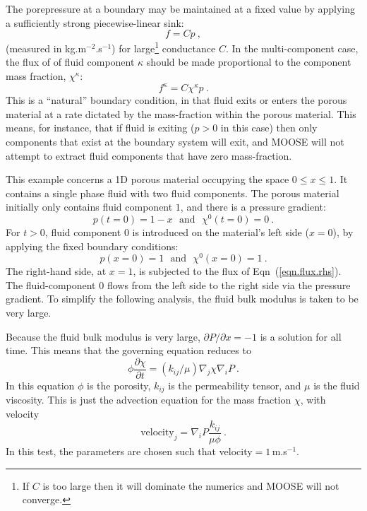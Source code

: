 \documentclass[]{scrreprt}
\begin{document}
The porepressure at a boundary may be maintained at a fixed value by
applying a sufficiently strong piecewise-linear sink:
\begin{equation}
f = Cp \ ,
\end{equation}
(measured in kg.m$^{-2}$.s$^{-1}$) for large\footnote{If $C$ is too
  large then it will dominate the numerics and MOOSE will not
  converge.} conductance $C$.  In the multi-component case, the flux
of of fluid component $\kappa$ should be made proportional to the
component mass fraction, $\chi^{\kappa}$:
\begin{equation}
f^{\kappa} = C\chi^{\kappa}p \ .
\label{eqn.flux.rhs}
\end{equation}
This is a ``natural'' boundary condition, in that fluid exits or
enters the porous material at a rate dictated by the mass-fraction
within the porous material.  This means, for instance, that if fluid
is exiting ($p>0$ in this case) then only components that exist at the
boundary system will exit, and MOOSE will not attempt to extract fluid
components that have zero mass-fraction.

This example concerns a 1D porous material occupying the space $0\leq
x \leq 1$.  It contains a single phase fluid with two
fluid components.  The porous material initially only contains fluid
component $1$, and there is a pressure gradient:
\begin{equation}
p(t=0) = 1 - x \ \ \ \mbox{and}\ \ \ \chi^{0}(t=0) = 0 \ .
\end{equation}
For $t>0$, fluid component $0$ is introduced on the material's left
side ($x=0$), by applying the fixed boundary conditions:
\begin{equation}
p(x=0) = 1 \ \ \ \mbox{and}\ \ \ \chi^{0}(x=0) = 1 \ .
\end{equation}
The right-hand side, at $x=1$, is subjected to the flux of
Eqn~(\ref{eqn.flux.rhs}).  The fluid-component $0$ flows from the left
side to the right side via the pressure gradient.  To simplify the
following analysis, the fluid bulk modulus is taken to be very large.

Because the fluid bulk modulus is very large, $\partial P/\partial x = -1$ is a
solution for all time.  This means that the governing equation reduces
to
\begin{equation}
\phi \frac{\partial \chi}{\partial t} =  (k_{ij}/\mu) \nabla_{j}
\chi \nabla_{i}P \ .
\end{equation}
In this equation $\phi$ is the porosity, $k_{ij}$ is the permeability
tensor, and $\mu$ is the fluid viscosity.  This is just the advection
equation for the mass fraction $\chi$, with velocity
\begin{equation}
\mbox{velocity}_{j} = \nabla_{i}P\frac{k_{ij}}{\mu\phi} \ .
\end{equation}
In this test, the parameters are chosen such that velocity$=1$\,m.s$^{-1}$.
\end{document}
